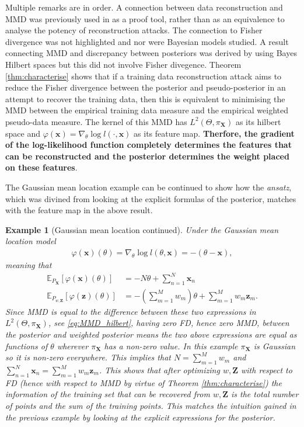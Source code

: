 \documentclass[hyperref]{article}
\theoremstyle{plain}
\newtheorem{example}{Example}[section]
\theoremstyle{remark}
\newcommand{\bx}{\mathbf{x}}
\newcommand{\bz}{\mathbf{z}}
\newcommand{\bX}{\mathbf{X}}
\newcommand{\bZ}{\mathbf{Z}}
\newcommand{\bbE}{\mathbb{E}}
\begin{document}
Multiple remarks are in order. A connection between data reconstruction and MMD was previously used in \citet{Loo2023} as a proof tool, rather than as an equivalence to analyse the potency of reconstruction attacks. The connection to Fisher divergence was not highlighted and nor were Bayesian models studied. A result connecting MMD and discrepancy between posteriors was derived by \citet{Wynne2023} using Bayes Hilbert spaces but this did not involve Fisher divegence. Theorem \ref{thm:characterise} shows that if a training data reconstruction attack aims to reduce the Fisher divergence between the posterior and pseudo-posterior in an attempt to recover the training data, then this is equivalent to minimising the MMD between the empirical training data measure and the empirical weighted pseudo-data measure. The kernel of this MMD has $L^{2}(\Theta, \pi_{\bX})$ as its hilbert space and $\varphi(\bx) = \nabla_{\theta}\log l(\cdot,\bx)$ as its feature map. \textbf{Therfore, the gradient of the log-likelihood function completely determines the features that can be reconstructed and the posterior determines the weight placed on these features}. 

The Gaussian mean location example can be continued to show how the \textit{ansatz}, which was divined from looking at the explicit formulas of the posterior, matches with the feature map in the above result. 

\begin{example}[Gaussian mean location continued]
	Under the Gaussian mean location model 
	\begin{align*}
		\varphi(\bx)(\theta) = \nabla_{\theta}\log l(\theta,\bx) = -(\theta - \bx),
	\end{align*}
	meaning that
	\begin{align*}
		\bbE_{P_{\bX}}[\varphi(\bx)(\theta)] & = -N\theta + \sum_{n=1}^{N}\bx_{n}\\
		\bbE_{P_{w,\bZ}}[\varphi(\bz)(\theta)] & = -\left(\sum_{m=1}^{M}w_{m}\right)\theta + \sum_{m=1}^{M}w_{m}\bz_{m}.
	\end{align*}
	Since MMD is equal to the difference between these two expressions in $L^{2}(\Theta,\pi_{\bX})$, see \eqref{eq:MMD_hilbert}, having zero FD, hence zero MMD, between the posterior and weighted posterior means the two above expressions are equal as functions of $\theta$ wherever $\pi_{\bX}$ has a non-zero value. In this example $\pi_{\bX}$ is Gaussian so it is non-zero everywhere. This implies that $N = \sum_{m=1}^{M}w_{m}$ and $\sum_{n=1}^{N}\bx_{n} = \sum_{m=1}^{M}w_{m}\bz_{m}$. This shows that after optimizing $w,\bZ$ with respect to FD (hence with respect to MMD by virtue of Theorem \ref{thm:characterise}) the information of the training set that can be recovered from $w,\bZ$ is the total number of points and the sum of the training points. This matches the intuition gained in the previous example by looking at the explicit expressions for the posterior.  
\end{example}
\end{document}
